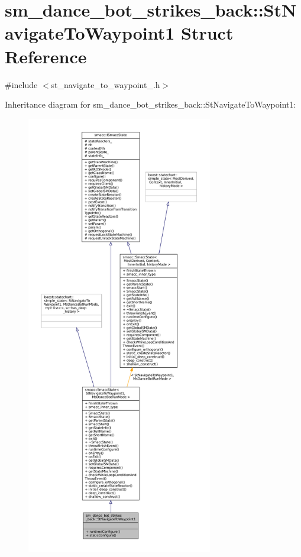 \hypertarget{structsm__dance__bot__strikes__back_1_1StNavigateToWaypoint1}{}\section{sm\+\_\+dance\+\_\+bot\+\_\+strikes\+\_\+back\+:\+:St\+Navigate\+To\+Waypoint1 Struct Reference}
\label{structsm__dance__bot__strikes__back_1_1StNavigateToWaypoint1}


{\ttfamily \#include $<$st\+\_\+navigate\+\_\+to\+\_\+waypoint\+\_.\+h$>$}



Inheritance diagram for sm\+\_\+dance\+\_\+bot\+\_\+strikes\+\_\+back\+:\+:St\+Navigate\+To\+Waypoint1\+:
\nopagebreak
\begin{figure}[H]
\begin{center}
\leavevmode
\includegraphics[height=550pt]{structsm__dance__bot__strikes__back_1_1StNavigateToWaypoint1__inherit__graph}
\end{center}
\end{figure}


